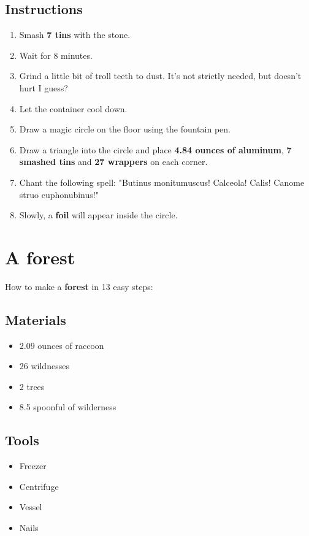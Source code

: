 \documentclass{article}
\begin{document}
\subsection{Instructions}\begin{enumerate}
\item 
Smash \textbf{7 tins} with the stone.
\item 
Wait for 8 minutes.
\item 
Grind a little bit of troll teeth to dust. It's not strictly needed, but doesn't hurt I guess?
\item 
Let the container cool down.
\item 
Draw a magic circle on the floor using the fountain pen.
\item 
Draw a triangle into the circle and place \textbf{4.84 ounces of aluminum}, \textbf{7 smashed tins} and \textbf{27 wrappers} on each corner.
\item 
Chant the following spell: "Butinus monitumuscus! Calceola! Calis! Canome struo euphonubinus!"
\item 
Slowly, a \textbf{foil} will appear inside the circle.
\end{enumerate}
\newpage
\section{A forest}How to make a \textbf{forest} in 13 easy steps:

\subsection{Materials}\begin{itemize}
\item 
2.09 ounces of raccoon
\item 
26 wildnesses
\item 
2 trees
\item 
8.5 spoonful of wilderness
\end{itemize}
\subsection{Tools}\begin{itemize}
\item 
Freezer
\item 
Centrifuge
\item 
Vessel
\item 
Nails
\end{itemize}
\end{document}
